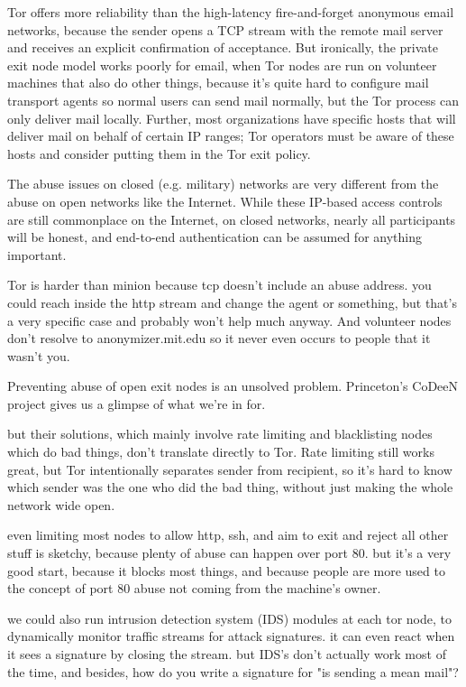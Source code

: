 \documentclass[times,10pt,twocolumn]{article}
\begin{document}
Tor offers more reliability than the high-latency fire-and-forget
anonymous email networks, because the sender opens a TCP stream
with the remote mail server and receives an explicit confirmation of
acceptance. But ironically, the private exit node model works poorly for
email, when Tor nodes are run on volunteer machines that also do other
things, because it's quite hard to configure mail transport agents so
normal users can send mail normally, but the Tor process can only deliver
mail locally. Further, most organizations have specific hosts that will
deliver mail on behalf of certain IP ranges; Tor operators must be aware
of these hosts and consider putting them in the Tor exit policy.

The abuse issues on closed (e.g. military) networks are very different
from the abuse on open networks like the Internet. While these IP-based
access controls are still commonplace on the Internet, on closed networks,
nearly all participants will be honest, and end-to-end authentication
can be assumed for anything important.

Tor is harder than minion because tcp doesn't include an abuse
address. you could reach inside the http stream and change the agent
or something, but that's a very specific case and probably won't help
much anyway.
And volunteer nodes don't resolve to anonymizer.mit.edu so it never
even occurs to people that it wasn't you.

Preventing abuse of open exit nodes is an unsolved problem. Princeton's
CoDeeN project \cite{darkside} gives us a glimpse of what we're in for.

but their solutions, which mainly involve rate limiting and blacklisting
nodes which do bad things, don't translate directly to Tor. Rate limiting
still works great, but Tor intentionally separates sender from recipient,
so it's hard to know which sender was the one who did the bad thing,
without just making the whole network wide open.

even limiting most nodes to allow http, ssh, and aim to exit and reject
all other stuff is sketchy, because plenty of abuse can happen over
port 80. but it's a very good start, because it blocks most things,
and because people are more used to the concept of port 80 abuse not
coming from the machine's owner.

we could also run intrusion detection system (IDS) modules at each tor
node, to dynamically monitor traffic streams for attack signatures. it
can even react when it sees a signature by closing the stream. but IDS's
don't actually work most of the time, and besides, how do you write a
signature for "is sending a mean mail"?
\end{document}
